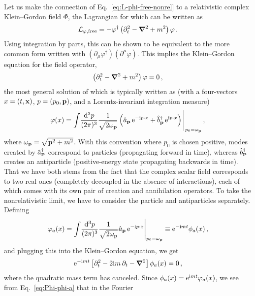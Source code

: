 Let us make the connection of Eq.~\eqref{eq:L-phi-free-nonrel} to a
relativistic complex Klein--Gordon field $\Phi$, the Lagrangian for which can be 
written as
%
\begin{equation}
 \mathcal{L}_{\varphi,\text{free}}
 = {-}\varphi^\dagger\left(\partial_t^2 - \boldsymbol{\nabla}^2 + m^2\right)\varphi 
\,.
\end{equation}
%
Using integration by parts, this can be shown to be equivalent to the more 
common form written with $(\partial_\mu\varphi^\dagger)(\partial^\mu\varphi)$.  
This implies the Klein--Gordon equation for the field operator,
%
\begin{equation}
 \left(\partial_t^2 - \boldsymbol{\nabla}^2 + m^2\right)\varphi = 0 \,,
\end{equation}
%
the most general solution of which is typically written as (with a 
four-vectors $x=(t,\mathbf{x})$, $p=(p_0,\mathbf{p})$, and a Lorentz-invariant integration 
measure)
%
\begin{equation}
 \varphi(x)
 = \int\!\frac{\dd^3p}{(2\pi)^3} \frac{1}{\sqrt{2\omega_\vp}}\left(
 \hat{a}_\vp\,\eex^{-\ii p\cdot x} + \hat{b}^\dagger_\vp\,\eex^{\ii p\cdot x}
 \right)\Bigg|_{p_0=\omega_\vp} \,,
\label{eq:Phi}
\end{equation}
%
where $\omega_{\mathbf{p}} = \sqrt{\mathbf{p}^2+m^2}$.  With this convention where $p_0$ is 
chosen positive, modes created by $\hat{a}^\dagger_{\mathbf{p}}$ correspond to particles 
(propagating forward in time), whereas $\hat{b}^\dagger_{\mathbf{p}}$ creates an 
antiparticle (positive-energy state propagating backwards in time).  That we 
have both stems from the fact that the complex scalar field corresponds to two 
real ones (completely decoupled in the absence of interactions), each of which 
comes with its own pair of creation and annihilation operators.  To take 
the nonrelativistic limit, we have to consider the particle and antiparticles 
separately.  Defining
%
\begin{equation}
 \varphi_a(x) = \int\!\frac{\dd^3p}{(2\pi)^3} \frac{1}{\sqrt{2\omega_\vp}}
 \hat{a}_\vp\,\eex^{-\ii p\cdot x}\Bigg|_{p_0=\omega_\vp}
 \equiv \eex^{-\ii m t} \phi_a(x) \,,
\label{eq:Phi-phi-a}
\end{equation}
%
and plugging this into the Klein--Gordon equation, we get
%
\begin{equation}
 \eex^{-\ii m t} \left[\partial_t^2 - 2\ii m\,\partial_t
 - \vNabla^2\right] \phi_a(x) = 0 \,,
\label{eq:KG-phi-a}
\end{equation}
%
where the quadratic mass term has canceled.  Since $\phi_a(x) = \mathrm{e}^{\mathrm{i} m t} 
\varphi_a(x)$, we see from Eq.~\eqref{eq:Phi-phi-a} that in the Fourier 
